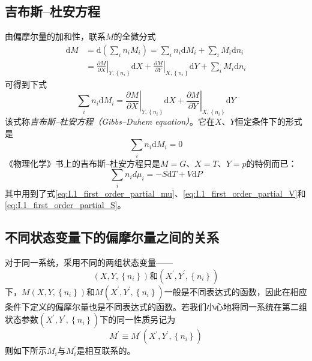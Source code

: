 \documentclass[main.tex]{subfiles}
\begin{document}
\subsection{吉布斯--杜安方程}
由偏摩尔量的加和性，联系$M$的全微分式
\begin{align*}
  \mathrm{d}M & =\mathrm{d}\left(\sum_in_iM_i\right)=\sum_in_i\mathrm{d}M_i+\sum_iM_i\mathrm{d}n_i                                                                                                \\
              & =\left.\frac{\partial M}{\partial X}\right|_{Y,\left\{n_i\right\}}\mathrm{d}X+\left.\frac{\partial M}{\partial Y}\right|_{X,\left\{n_i\right\}}\mathrm{d}Y+\sum_iM_i\mathrm{d}n_i
\end{align*}
可得到下式
\begin{equation}\label{eq:II.2_Gibbs_Duhem_eq}
  \sum_in_i\mathrm{d}M_i=\left.\frac{\partial M}{\partial X}\right|_{Y,\left\{n_i\right\}}\mathrm{d}X+\left.\frac{\partial M}{\partial Y}\right|_{X,\left\{n_i\right\}}\mathrm{d}Y
\end{equation}
该式称\emph{吉布斯--杜安方程（Gibbs--Duhem equation）}。它在$X$、$Y$恒定条件下的形式是
\begin{equation}\label{eq:II.2_Gibbs_Duhem_eq_XYConst}
  \sum_in_i\mathrm{d}M_i=0
\end{equation}
《物理化学》书上的吉布斯--杜安方程只是$M=G$、$X=T$、$Y=p$的特例而已：
\begin{equation}\label{eq:II.2_Gibbs_Duhem_eq_for_G}
  \sum_in_id\mu_i=-S\mathrm{d}T+V\mathrm{d}P
\end{equation}
其中用到了式\eqref{eq:I.1_first_order_partial_mu}、\eqref{eq:I.1_first_order_partial_V}和\eqref{eq:I.1_first_order_partial_S}。


\subsection{不同状态变量下的偏摩尔量之间的关系}
对于同一系统，采用不同的两组状态变量——
\[\left(X,Y,\left\{n_i\right\}\right)\text{和}\left(X^\prime,Y^\prime,\left\{n_i\right\}\right)\]
下，$M\left(X,Y,\left\{n_i\right\}\right)$和$M\left(X^\prime, Y^\prime,\left\{n_i\right\}\right)$一般是不同表达式的函数，因此在相应条件下定义的偏摩尔量也是不同表达式的函数。若我们小心地将同一系统在第二组状态参数$\left(X^\prime,Y^\prime,\left\{n_i\right\}\right)$下的同一性质另记为
\[M^\prime\equiv M^\prime\left(X^\prime,Y^\prime,\left\{n_i\right\}\right)\]
则如下所示$M_i$与$M_i^\prime$是相互联系的。
\end{document}

